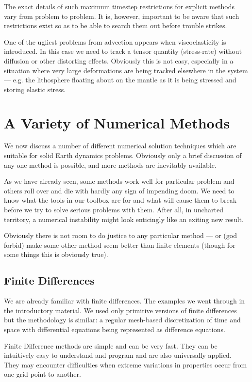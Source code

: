\documentclass[10pt]{article}
\begin{document}
	The exact details of such maximum timestep restrictions for explicit
	methods vary from problem to problem. It is, however, important 
	to be aware that such restrictions exist so as to be able to search them
	out before trouble strikes.
	
	One of the ugliest problems from advection appears when viscoelasticity is introduced. In this case
	we need to track a tensor quantity (stress-rate) without diffusion or other
	distorting effects.  Obviously this is not easy, especially in a situation where
	very large deformations are being tracked elsewhere in the system --- e.g. the lithosphere
	floating about on the mantle as it is being stressed and storing elastic stress.
	
\section{A Variety of Numerical Methods}
	
	We now discuss a number of different numerical
	solution techniques which are suitable for solid Earth dynamics
	problems. Obviously only a brief discussion of any one method
	is possible, and more methods are inevitably available.
	
	As we have already seen, some methods work well for
	particular problem and others roll over and die with hardly 
	any sign of impending doom. We need to know what the
	tools in our toolbox are for and what will cause them to 
	break before we try to solve serious problems with them.
	After all, in uncharted territory, a numerical  instability 
	might look enticingly like an exiting new result.
	
	Obviously there is not room to do justice to any particular
	method --- or (god forbid) make some other method seem better
	than finite elements (though for some things this is obviously
	true).
	
	\subsection{Finite Differences}
		We are already familiar with finite differences. The 
		examples we went through in the introductory material. 
		We used only primitive versions of finite differences but
		the methodology is similar: a regular mesh-based
		discretization of time and space with differential 
		equations being represented as difference equations.
		
		Finite Difference methods are simple and can be very 
		fast. They can be intuitively easy to understand and 
		program and are also universally applied. 
		They may encounter
		difficulties when extreme variations in properties occur
		from one grid point to another. 
		
\end{document}

